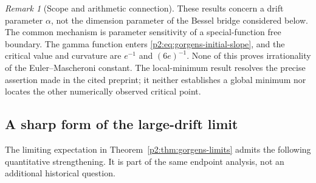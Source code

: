 \documentclass[11pt,a4paper]{article}
\theoremstyle{definition}
\theoremstyle{remark}
\newtheorem{remark}[theorem]{Remark}
\numberwithin{equation}{section}
\begin{document}
\begin{remark}[Scope and arithmetic connection]
These results concern a drift parameter $\alpha$, not the dimension
parameter of the Bessel bridge considered below. The common mechanism is
parameter sensitivity of a special-function free boundary. The gamma
function enters \eqref{p2:eq:gorgens-initial-slope}, and the critical
value and curvature are $e^{-1}$ and $(6e)^{-1}$. None of this proves
irrationality of the Euler--Mascheroni constant. The local-minimum
result resolves the precise assertion made in the cited preprint;
it neither establishes a global minimum nor locates the other
numerically observed critical point.
\end{remark}

\subsection{A sharp form of the large-drift limit}

The limiting expectation in Theorem~\ref{p2:thm:gorgens-limits} admits
the following quantitative strengthening. It is part of the same
endpoint analysis, not an additional historical question.
\end{document}
